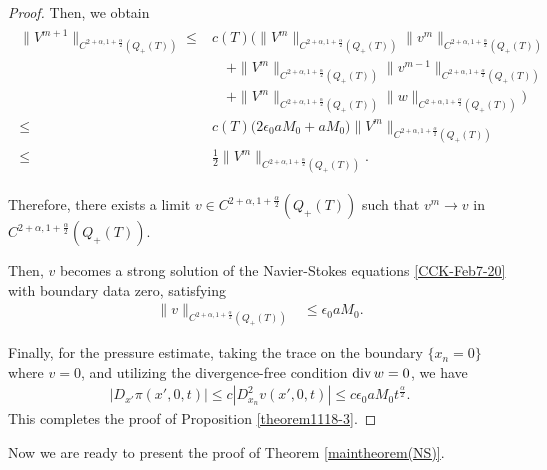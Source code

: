 \documentclass{amsart}
\numberwithin{equation}{section}
\newcommand{\ep}{{ \epsilon  }}
\newcommand {\al}{\alpha}
\begin{document}
\begin{proof}
Then, we obtain
\begin{align*}%
\begin{split}
\| V^{m+1}\|_{ C^{2 +\al, 1 +\frac{\al}2} ( Q_+ (T) ) } 
  \leq & c(T) \Big( \| V^m\|_{ C^{2 +\al, 1+\frac{\al}2} ( Q_+ (T) ) } \| v^m \|_{ C^{2 +\al, 1+\frac{\al}2} ( Q_+ (T) ) } \\
  &\quad + \| V^{m}\|_{ C^{2 +\al, 1 +\frac{\al}2} ( Q_+ (T) ) } \| v^{m-1} \|_{ C^{2+\al, 1+\frac{\al}2} ( Q_+ (T) ) }\\
  & \quad + \| V^{m}\|_{ C^{2 +\al, 1 +\frac{\al}2} ( Q_+ (T) ) } \|w \|_{ C^{2 +\al, 1 +\frac{\al}2} ( Q_+ (T) ) }\Big)\\
 \leq & c(T) \Big(2\ep_0 a M_0 + a M_0 \Big) \| V^m\|_{ C^{2 +\al, 1 +\frac{\al}2} ( Q_+ (T) ) }\\
  \leq &\frac12 \| V^m\|_{ C^{2 +\al, 1 +\frac{\al}2} ( Q_+ (T) ) }.
\end{split}
\end{align*}
 
Therefore, there exists a limit $v \in C^{2 +\al, 1 +\frac{\al}2} ( Q_+ (T) ) $ such that $v^m \rightarrow v$ in $C^{2 +\al, 1 +\frac{\al}2} ( Q_+ (T) )$.   

Then, $v$ becomes a strong solution of the Navier-Stokes equations \eqref{CCK-Feb7-20} with boundary data zero, satisfying
\begin{align*}%
\| v\|_{ C^{2+\al, 1 +\frac{\al}2}( Q_+ (T) ) } & \leq \ep_0 a M_0. 
\end{align*}

Finally, for the pressure estimate, taking the trace on the boundary $\{x_n = 0\}$ where $v=0$, and utilizing the divergence-free condition ${\rm div } \, w = 0$, we have
\begin{align*} 
| D_{x'} \pi (x', 0, t)| \leq c | D_{x_n}^2 v(x', 0, t) | \leq c \ep_0 a M_0 t^{\frac{\al}2}.
\end{align*}
This completes the proof of Proposition \ref{theorem1118-3}.
\end{proof}
 


 



Now we are ready to present the proof of Theorem \ref{maintheorem(NS)}.
\end{document}
